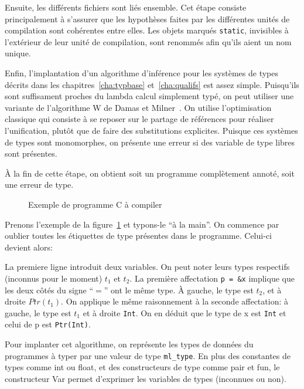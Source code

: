 Ensuite, les différents fichiers sont liés ensemble. Cet étape consiste
principalement à s'assurer que les hypothèses faites par les différentes unités
de compilation sont cohérentes entre elles. Les objets marqués \texttt{static},
invisibles à l'extérieur de leur unité de compilation, sont renommés afin qu'ils
aient un nom unique.

Enfin, l'implantation d'un algorithme d'inférence pour les systèmes de types
décrits dans les chapitres~\ref{cha:typbase} et~\ref{cha:qualifs} est assez
simple. Puisqu'ils sont suffisament proches du lambda calcul simplement typé, on
peut utiliser une variante de l'algorithme W de Damas et
Milner~\cite{DamasMilner}. On utilise l'optimisation classique qui consiste à se
reposer sur le partage de références pour réaliser l'unification, plutôt que de
faire des substitutions explicites. Puisque ces systèmes de types sont
monomorphes, on présente une erreur si des variable de type libres sont
présentes.

À la fin de cette étape, on obtient soit un programme complètement annoté, soit
une erreur de type.

\begin{figure} %


  \caption{Exemple de programme C à compiler}
\label{fig:exunif:c}
\end{figure} %

Prenons l'exemple de la figure~\ref{fig:exunif:c} et typons-le ``à la main''. On
commence par oublier toutes les étiquettes de type présentes dans le programme.
Celui-ci devient alors:


La premiere ligne introduit deux variables. On peut noter leurs types respectifs
(inconnus pour le moment) $t_1$ et $t_2$. La première affectation \texttt{p =
\&x} implique que les deux côtés du signe ``$=$'' ont le même type. À gauche, le
type est $t_2$, et à droite $Ptr(t_1)$. On applique le même raisonnement à la
seconde affectation: à gauche, le type est $t_1$ et à droite \texttt{Int}. On en
déduit que le type de x est \texttt{Int} et celui de p est \verb!Ptr(Int)!.


Pour implanter cet algorithme, on représente les types de données du programmes
à typer par une valeur de type \texttt{ml\_type}. En plus des constantes de
types comme int ou float, et des constructeurs de type comme pair et fun, le
constructeur Var permet d'exprimer les variables de types (inconnues ou non).

